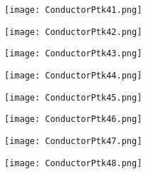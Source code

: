 \documentclass[pdf]{beamer}
\begin{document}
\begin{frame}
\begin{figure}[!h]
\centering
\texttt{[image: ConductorPtk41.png]}
\end{figure}
\end{frame}

\begin{frame}
\begin{figure}[!h]
\centering
\texttt{[image: ConductorPtk42.png]}
\end{figure}
\end{frame}

\begin{frame}
\begin{figure}[!h]
\centering
\texttt{[image: ConductorPtk43.png]}
\end{figure}
\end{frame}

\begin{frame}
\begin{figure}[!h]
\centering
\texttt{[image: ConductorPtk44.png]}
\end{figure}
\end{frame}

\begin{frame}
\begin{figure}[!h]
\centering
\texttt{[image: ConductorPtk45.png]}
\end{figure}
\end{frame}

\begin{frame}
\begin{figure}[!h]
\centering
\texttt{[image: ConductorPtk46.png]}
\end{figure}
\end{frame}

\begin{frame}
\begin{figure}[!h]
\centering
\texttt{[image: ConductorPtk47.png]}
\end{figure}
\end{frame}

\begin{frame}
\begin{figure}[!h]
\centering
\texttt{[image: ConductorPtk48.png]}
\end{figure}
\end{frame}
\end{document}
